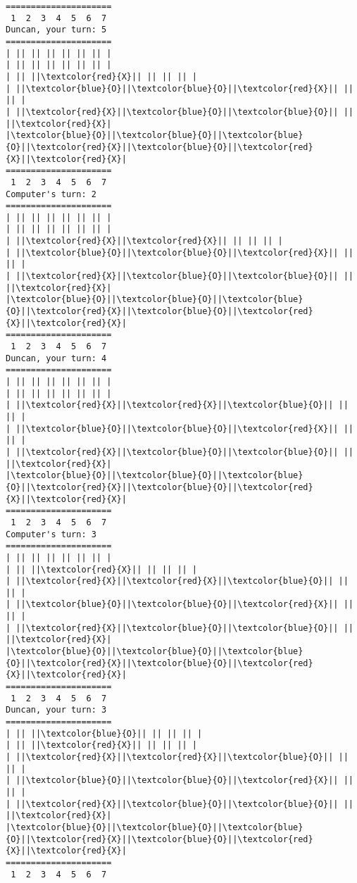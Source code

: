 \documentclass{article}
\begin{document}
\begin{Verbatim}[commandchars=\\\{\}]
=====================
 1  2  3  4  5  6  7
Duncan, your turn: 5
=====================
| || || || || || || |
| || || || || || || |
| || ||\textcolor{red}{X}|| || || || |
| ||\textcolor{blue}{O}||\textcolor{blue}{O}||\textcolor{red}{X}|| || || |
| ||\textcolor{red}{X}||\textcolor{blue}{O}||\textcolor{blue}{O}|| || ||\textcolor{red}{X}|
|\textcolor{blue}{O}||\textcolor{blue}{O}||\textcolor{blue}{O}||\textcolor{red}{X}||\textcolor{blue}{O}||\textcolor{red}{X}||\textcolor{red}{X}|
=====================
 1  2  3  4  5  6  7
Computer's turn: 2
=====================
| || || || || || || |
| || || || || || || |
| ||\textcolor{red}{X}||\textcolor{red}{X}|| || || || |
| ||\textcolor{blue}{O}||\textcolor{blue}{O}||\textcolor{red}{X}|| || || |
| ||\textcolor{red}{X}||\textcolor{blue}{O}||\textcolor{blue}{O}|| || ||\textcolor{red}{X}|
|\textcolor{blue}{O}||\textcolor{blue}{O}||\textcolor{blue}{O}||\textcolor{red}{X}||\textcolor{blue}{O}||\textcolor{red}{X}||\textcolor{red}{X}|
=====================
 1  2  3  4  5  6  7
Duncan, your turn: 4
=====================
| || || || || || || |
| || || || || || || |
| ||\textcolor{red}{X}||\textcolor{red}{X}||\textcolor{blue}{O}|| || || |
| ||\textcolor{blue}{O}||\textcolor{blue}{O}||\textcolor{red}{X}|| || || |
| ||\textcolor{red}{X}||\textcolor{blue}{O}||\textcolor{blue}{O}|| || ||\textcolor{red}{X}|
|\textcolor{blue}{O}||\textcolor{blue}{O}||\textcolor{blue}{O}||\textcolor{red}{X}||\textcolor{blue}{O}||\textcolor{red}{X}||\textcolor{red}{X}|
=====================
 1  2  3  4  5  6  7
Computer's turn: 3
=====================
| || || || || || || |
| || ||\textcolor{red}{X}|| || || || |
| ||\textcolor{red}{X}||\textcolor{red}{X}||\textcolor{blue}{O}|| || || |
| ||\textcolor{blue}{O}||\textcolor{blue}{O}||\textcolor{red}{X}|| || || |
| ||\textcolor{red}{X}||\textcolor{blue}{O}||\textcolor{blue}{O}|| || ||\textcolor{red}{X}|
|\textcolor{blue}{O}||\textcolor{blue}{O}||\textcolor{blue}{O}||\textcolor{red}{X}||\textcolor{blue}{O}||\textcolor{red}{X}||\textcolor{red}{X}|
=====================
 1  2  3  4  5  6  7
Duncan, your turn: 3
=====================
| || ||\textcolor{blue}{O}|| || || || |
| || ||\textcolor{red}{X}|| || || || |
| ||\textcolor{red}{X}||\textcolor{red}{X}||\textcolor{blue}{O}|| || || |
| ||\textcolor{blue}{O}||\textcolor{blue}{O}||\textcolor{red}{X}|| || || |
| ||\textcolor{red}{X}||\textcolor{blue}{O}||\textcolor{blue}{O}|| || ||\textcolor{red}{X}|
|\textcolor{blue}{O}||\textcolor{blue}{O}||\textcolor{blue}{O}||\textcolor{red}{X}||\textcolor{blue}{O}||\textcolor{red}{X}||\textcolor{red}{X}|
=====================
 1  2  3  4  5  6  7

\end{Verbatim}
\end{document}
